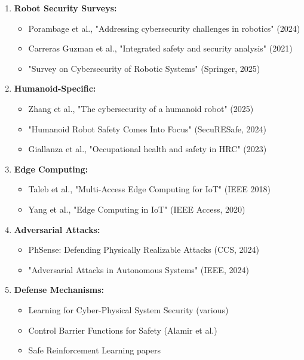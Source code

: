 \documentclass[conference]{IEEEtran}
\begin{document}
\begin{enumerate}
    \item \textbf{Robot Security Surveys:}
    \begin{itemize}
        \item Porambage et al., "Addressing cybersecurity challenges in robotics" (2024)
        \item Carreras Guzman et al., "Integrated safety and security analysis" (2021)
        \item "Survey on Cybersecurity of Robotic Systems" (Springer, 2025)
    \end{itemize}
    \item \textbf{Humanoid-Specific:}
    \begin{itemize}
        \item Zhang et al., "The cybersecurity of a humanoid robot" (2025)
        \item "Humanoid Robot Safety Comes Into Focus" (SecuRESafe, 2024)
        \item Giallanza et al., "Occupational health and safety in HRC" (2023)
    \end{itemize}
    \item \textbf{Edge Computing:}
    \begin{itemize}
        \item Taleb et al., "Multi-Access Edge Computing for IoT" (IEEE 2018)
        \item Yang et al., "Edge Computing in IoT" (IEEE Access, 2020)
    \end{itemize}
    \item \textbf{Adversarial Attacks:}
    \begin{itemize}
        \item PhSense: Defending Physically Realizable Attacks (CCS, 2024)
        \item "Adversarial Attacks in Autonomous Systems" (IEEE, 2024)
    \end{itemize}
    \item \textbf{Defense Mechanisms:}
    \begin{itemize}
        \item Learning for Cyber-Physical System Security (various)
        \item Control Barrier Functions for Safety (Alamir et al.)
        \item Safe Reinforcement Learning papers
    \end{itemize}
\end{enumerate}
\end{document}
